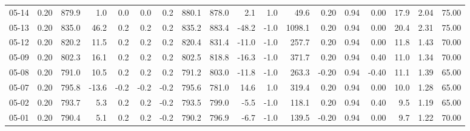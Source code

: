 \begin{threeparttable}
{\begin{tabular}{lrrrrrrrrrrrrrrrrr}
  05-14 &     0.20 & 879.9 &               1.0 &               0.0 &                0.0 &                0.2 & 880.1 & 878.0 &        2.1 &                      1.0 &                49.6 &       0.20 &      0.94 &           0.00 &             17.9 &            2.04 &                  75.00 \\
  05-13 &     0.20 & 835.0 &              46.2 &               0.2 &                0.2 &                0.2 & 835.2 & 883.4 &      -48.2 &                     -1.0 &              1098.1 &       0.20 &      0.94 &           0.00 &             20.4 &            2.31 &                  75.00 \\
  05-12 &     0.20 & 820.2 &              11.5 &               0.2 &                0.2 &                0.2 & 820.4 & 831.4 &      -11.0 &                     -1.0 &               257.7 &       0.20 &      0.94 &           0.00 &             11.8 &            1.43 &                  70.00 \\
  05-09 &     0.20 & 802.3 &              16.1 &               0.2 &                0.2 &                0.2 & 802.5 & 818.8 &      -16.3 &                     -1.0 &               371.7 &       0.20 &      0.94 &           0.40 &             11.0 &            1.34 &                  70.00 \\
  05-08 &     0.20 & 791.0 &              10.5 &               0.2 &                0.2 &                0.2 & 791.2 & 803.0 &      -11.8 &                     -1.0 &               263.3 &      -0.20 &      0.94 &          -0.40 &             11.1 &            1.39 &                  65.00 \\
  05-07 &     0.20 & 795.8 &             -13.6 &              -0.2 &               -0.2 &               -0.2 & 795.6 & 781.0 &       14.6 &                      1.0 &               319.4 &       0.20 &      0.94 &           0.00 &             10.0 &            1.28 &                  65.00 \\
  05-02 &     0.20 & 793.7 &               5.3 &               0.2 &                0.2 &               -0.2 & 793.5 & 799.0 &       -5.5 &                     -1.0 &               118.1 &       0.20 &      0.94 &           0.40 &              9.5 &            1.19 &                  65.00 \\
  05-01 &     0.20 & 790.4 &               5.1 &               0.2 &                0.2 &               -0.2 & 790.2 & 796.9 &       -6.7 &                     -1.0 &               139.5 &      -0.20 &      0.94 &           0.00 &              9.7 &            1.22 &                  70.00 \\

\end{tabular}}
\end{threeparttable}
